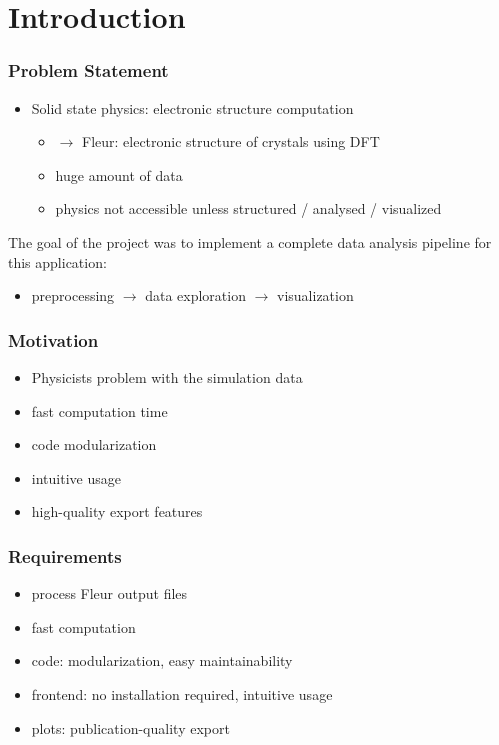 

%
\section{Introduction}
\label{sec:introduction}




\begin{frame}\frametitle{Problem Statement}
\begin{itemize}
\item Solid state physics: electronic structure computation
\begin{itemize}
\item \(\rightarrow\) Fleur: electronic structure of crystals using DFT
\item huge amount of data
\item physics not accessible unless structured / analysed / visualized
\end{itemize}
\end{itemize}
The goal of the project was to implement a complete data analysis pipeline for this application:
\begin{itemize}
\item preprocessing \(\rightarrow\) data exploration \(\rightarrow\) visualization
\end{itemize}
\end{frame}

\begin{frame}\frametitle{Motivation}
\begin{itemize}
\item Physicists problem with the simulation data
\item fast computation time
\item code modularization
\item intuitive usage
\item high-quality export features
\end{itemize}
\end{frame}

\begin{frame}\frametitle{Requirements}
\begin{itemize}
\item process Fleur output files
\item fast computation
\item code: modularization, easy maintainability
\item frontend: no installation required, intuitive usage
\item plots: publication-quality export
\end{itemize}
\end{frame}

